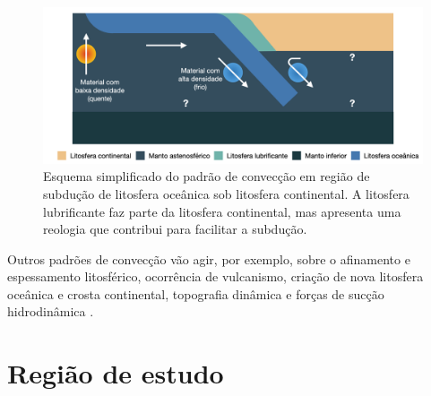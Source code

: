 \begin{figure}
    \centering
    \includegraphics[width=\textwidth]{fig/esquema-subducao.png}
    \caption{Esquema simplificado do padrão de convecção em região de subdução de litosfera oceânica sob litosfera continental. A litosfera lubrificante faz parte da litosfera continental, mas apresenta uma reologia que contribui para facilitar a subdução.}
    \label{fig:esquema-subducao}
\end{figure}

Outros padrões de convecção vão agir, por exemplo, sobre o afinamento e espessamento litosférico, ocorrência de vulcanismo, criação de nova litosfera oceânica e crosta continental, topografia dinâmica e forças de sucção hidrodinâmica \citep{allen2013basin,braun2010many,schepers_etal2017,stern2002subduction}.

\section{Região de estudo}
\label{areaDeEstudo}



